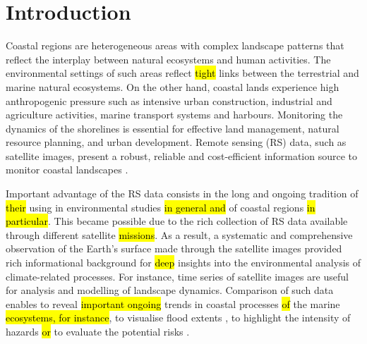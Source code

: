 \documentclass[jmse,article,submit,pdftex,moreauthors]{Definitions/mdpi}
\begin{document}
\section{Introduction}

Coastal regions are heterogeneous areas with\hl{ }complex landscape patterns that reflect the interplay between natural ecosystems and human activities. The environmental settings of such areas reflect \hl{tight} links between the terrestrial and marine natural ecosystems. On the other hand, coastal lands experience high anthropogenic pressure such as intensive urban construction, industrial and agriculture activities, marine transport systems and harbours. Monitoring the dynamics of the shorelines is essential for effective land management, natural resource planning, and urban development. Remote sensing (RS) data, such as satellite images, present a robust, reliable and cost-efficient information source to monitor coastal landscapes \cite{AGATE2024108639,Lemenkova202405,LIU2024120096}. 

Important advantage of the RS data consists in the long and ongoing tradition of \hl{their} using\hl{ }in environmental studies \hl{in general and} of coastal regions\hl{ in particular}. This became possible due to the rich collection of RS data available through different satellite \hl{missions}. As a result, a systematic and comprehensive observation of the Earth's surface made through the satellite images provided \hl{ }rich informational background for \hl{deep} insights into the environmental analysis of climate-related processes. For instance, time series of satellite images are useful for analysis and modelling of landscape dynamics. Comparison of such data enables to reveal \hl{important ongoing} trends in coastal processes \hl{of} the\hl{ }marine \hl{ecosystems, for instance}, to visualise flood extents \cite{10282975}, to highlight the intensity of hazards \cite{8517662} \hl{or} to evaluate the potential risks\hl{ }\cite{8900280}. 
\end{document}
